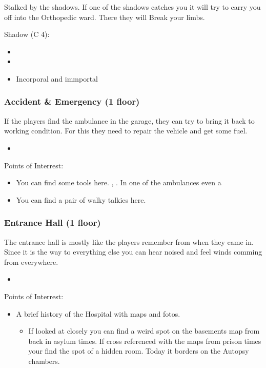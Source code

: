 \documentclass[11pt]{article}
\begin{document}
{Stalked by the shadows. If one of the shadows catches you it will try to carry you off into the Orthopedic ward. There they will Break your limbs.

Shadow (C 4):
\begin{itemize}
\item {}
\item {}
\item Incorporal and immportal
\end{itemize}
\subsubsection{Accident \& Emergency (1 floor)}
\label{sec:org21363d8}

If the players find the ambulance in the garage, they can try to bring it back to working condition. For this they need to repair the vehicle and get some fuel.

\begin{itemize}
\item {}
\end{itemize}

Points of Interrest:
\begin{itemize}
\item You can find some tools here. , . In one of the ambulances even a 
\item You can find a pair of walky talkies here.
\end{itemize}
\subsubsection{Entrance Hall (1 floor)}
\label{sec:orgd35af0c}

The entrance hall is mostly like the players remember from when they came in. Since it is the way to everything else you can hear noised and feel winds comming from everywhere.

\begin{itemize}
\item {}
\end{itemize}


Points of Interrest:
\begin{itemize}
\item A brief history of the Hospital with maps and fotos.
\begin{itemize}
\item If looked at closely you can find a weird spot on the basements map from back in asylum times.
If cross referenced with the maps from prison times your find the spot of a hidden room. Today it borders on the Autopsy chambers.
\end{itemize}
\end{itemize}
}
\end{document}

